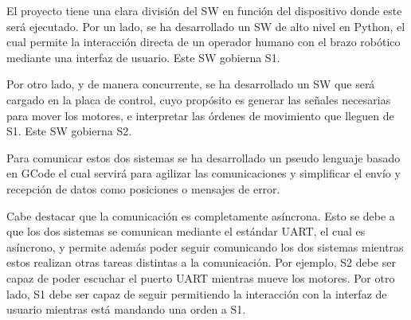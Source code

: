 El proyecto tiene una clara división del \ac{SW} en función del dispositivo donde este será ejecutado. Por un lado, se ha desarrollado un \ac{SW} de alto nivel en Python, el cual permite la interacción directa de un operador humano con el brazo robótico mediante una interfaz de usuario. Este \ac{SW} gobierna \ac{S1}. 

Por otro lado, y de manera concurrente, se ha desarrollado un \ac{SW} que será cargado en la placa de control, cuyo propósito es generar las señales necesarias para mover los motores, e interpretar las órdenes de movimiento que lleguen de \ac{S1}. Este \ac{SW} gobierna \ac{S2}.

Para comunicar estos dos sistemas se ha desarrollado un pseudo lenguaje basado en GCode el cual servirá para agilizar las comunicaciones y simplificar el envío y recepción de datos como posiciones o mensajes de error.

Cabe destacar que la comunicación es completamente asíncrona. Esto se debe a que los dos sistemas se comunican mediante el estándar UART, el cual es asíncrono, y permite además poder seguir comunicando los dos sistemas mientras estos realizan otras tareas distintas a la comunicación. Por ejemplo, \ac{S2} debe ser capaz de poder escuchar el puerto UART mientras mueve los motores. Por otro lado, \ac{S1} debe ser capaz de seguir permitiendo la interacción con la interfaz de usuario mientras está mandando una orden a \ac{S1}.
